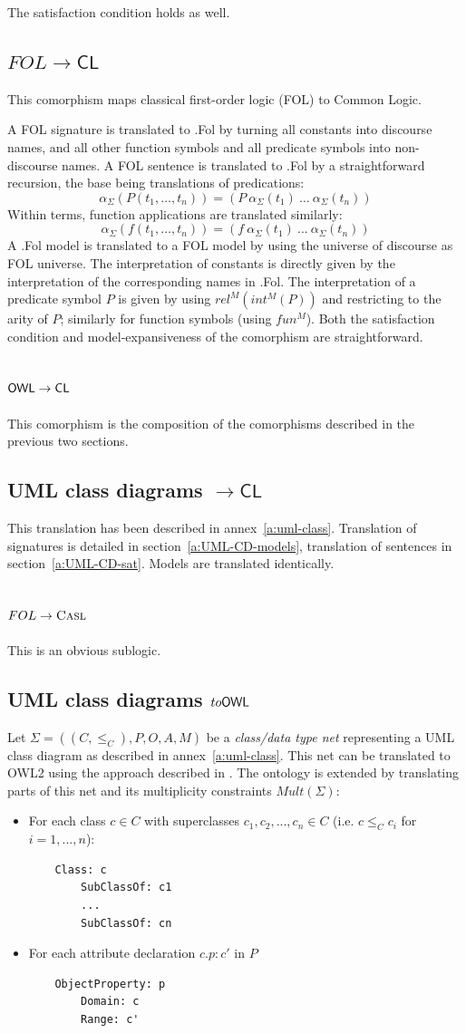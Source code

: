 \documentclass[10pt,fleqn,final]{scrreprt}
\newcommand{\cbs}[0]{\color{red}\xspace} %
\newcommand*{\CL}{\ensuremath{\mathsf{CL}}\xspace}
\newcommand{\ssclause}[1]{\subsection{#1}}
\newenvironment{definitions}[0]{\medskip }{}
\begin{document}
\begin{definitions}
	The satisfaction condition holds as well.

\ssclause{$FOL \rightarrow \CL$}

This comorphism  maps classical first-order logic (FOL) to Common Logic.


A FOL signature is translated to \Clogic.Fol by turning all constants
into discourse names, and all other function symbols and all predicate
symbols into non-discourse names. A FOL sentence is translated
to \Clogic.Fol by a straightforward recursion, the base being translations
of predications:
$$\alpha_\Sigma(P(t_1,\ldots,t_n)) = (P\ \alpha_\Sigma(t_1)\ \ldots\ \alpha_\Sigma(t_n))$$
Within terms, function applications are translated similarly:
$$\alpha_\Sigma(f(t_1,\ldots,t_n)) = (f\ \alpha_\Sigma(t_1)\ \ldots\ \alpha_\Sigma(t_n))$$
A \Clogic.Fol model is translated to a FOL model by using the universe of
discourse as FOL universe. The interpretation of constants is
directly given by the interpretation of the corresponding names
in \Clogic.Fol. The interpretation of a predicate symbol $P$ is given
by using $rel^M(int^M(P))$ and restricting to the arity of $P$;
similarly for function symbols (using $fun^M$). Both the satisfaction condition
and model-expansiveness of the comorphism are straightforward.

\ssclause{$\OWL \rightarrow \CL$}

This comorphism is the composition of the comorphisms described in the previous
two sections.

\ssclause{UML class diagrams $\to \CL$}
This translation has been described in annex~\ref{a:uml-class}. 
Translation of signatures is detailed in section~\ref{a:UML-CD-models},
translation of sentences in section~\ref{a:UML-CD-sat}.
Models are translated identically.

\ssclause{$FOL \to \textmd{\textsc{Casl}}$}
This is an obvious sublogic.

 
\cbs
\ssclause{UML class diagrams $to \mathsf{OWL}$}
Let $\Sigma = ((C, {\leq_C}), P, O, A, M)$ be a \emph{class/data type net} representing a UML class diagram as described in annex~\ref{a:uml-class}. This net can be translated to OWL2 using the approach described in \cite{zedlitz2012uml}.
The ontology is extended by translating parts of this net and its multiplicity constraints $\mathit{Mult}(\Sigma)$:
\begin{itemize}
\item For each class $c \in C$ with superclasses $c_1,c_2,...,c_n \in C$ (i.e. $c \leq_C c_i$ for $i=1,...,n$):
\begin{lstlisting} 
	Class: c
		SubClassOf: c1
		...
		SubClassOf: cn
\end{lstlisting}
\item For each attribute declaration $c.p:c'$ in $P$
\begin{lstlisting}
	ObjectProperty: p
		Domain: c
		Range: c'
\end{lstlisting}


\end{itemize}
\end{definitions}
\end{document}
